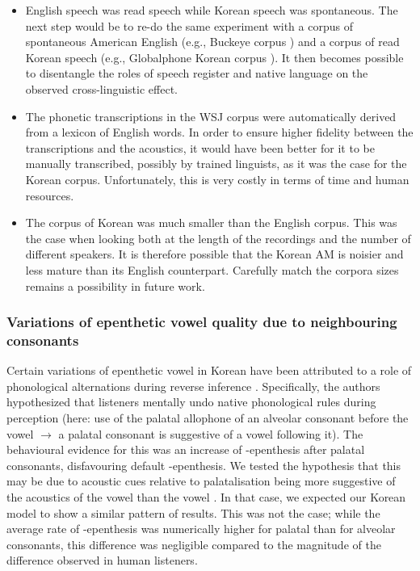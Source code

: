 {\begin{itemize}
\item English speech was read speech while Korean speech was spontaneous. The next step would be to re-do the same experiment with a corpus of spontaneous American English (e.g., Buckeye corpus \cite{pitt2007}) and a corpus of read Korean speech (e.g., Globalphone Korean corpus \cite{schultz2002}). It then becomes possible to disentangle the roles of speech register and native language on the observed cross-linguistic effect.

\item The phonetic transcriptions in the WSJ corpus were automatically derived from a lexicon of English words. In order to ensure higher fidelity between the transcriptions and the acoustics, it would have been better for it to be manually transcribed, possibly by trained linguists, as it was the case for the Korean corpus. Unfortunately, this is very costly in terms of time and human resources.

  \item The corpus of Korean was much smaller than the English corpus. This was the case when looking both at the length of the recordings and the number of different speakers. It is therefore possible that the Korean AM is noisier and less mature than its English counterpart. Carefully match the corpora sizes remains a possibility in future work.   
\end{itemize}

\subsubsection{Variations of epenthetic vowel quality due to neighbouring consonants}
Certain variations of epenthetic vowel in Korean have been attributed to a role of phonological alternations during reverse inference \cite{durvasula2015}. Specifically, the authors hypothesized that listeners mentally undo native phonological rules during perception (here: use of the palatal allophone of an alveolar consonant before the vowel  $\rightarrow$ a palatal consonant is suggestive of a vowel  following it). The behavioural evidence for this was an increase of -epenthesis after palatal consonants, disfavouring default -epenthesis. 
We tested the hypothesis that this may be due to acoustic cues relative to palatalisation being more suggestive of the acoustics of the vowel  than the vowel . In that case, we expected our Korean model to show a similar pattern of results. This was not the case; while the average rate of -epenthesis was numerically higher for palatal than for alveolar consonants, this difference was negligible compared to the magnitude of the difference observed in human listeners.

}
